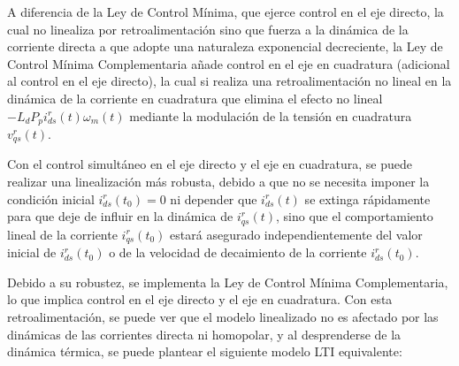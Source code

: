 \documentclass[blue,fullpaper]{ludusofficial}  %
\begin{document}
\begin{enumerate}
    A diferencia de la Ley de Control Mínima, que ejerce control en el eje directo, la cual no linealiza por retroalimentación sino que fuerza a la dinámica de la corriente directa a que adopte una naturaleza exponencial decreciente, la Ley de Control Mínima Complementaria añade control en el eje en cuadratura (adicional al control en el eje directo), la cual si realiza una retroalimentación no lineal en la dinámica de la corriente en cuadratura que elimina el efecto no lineal $-L_{d} P_{p} i_{ds}^{r}(t) \omega_{m}(t) $ mediante la modulación de la tensión en cuadratura $ v_{qs}^{r}(t)$.

    Con el control simultáneo en el eje directo y el eje en cuadratura, se puede realizar una linealización más robusta, debido a que no se necesita imponer la condición inicial $i_{ds}^{r}(t_0) = 0$ ni depender que $i_{ds}^{r}(t)$ se extinga rápidamente para que deje de influir en la dinámica de $i_{qs}^{r}(t)$, sino que el comportamiento lineal de la corriente $i_{qs}^{r}(t_0)$ estará asegurado independientemente del valor inicial de $i_{ds}^{r}(t_0)$ o de la velocidad de decaimiento de la corriente $i_{ds}^{r}(t_0)$.
\end{enumerate}

Debido a su robustez, se implementa la Ley de Control Mínima Complementaria, lo que implica control en el eje directo y el eje en cuadratura. Con esta retroalimentación, se puede ver que el modelo linealizado no es afectado por las dinámicas de las corrientes directa ni homopolar, y al desprenderse de la dinámica térmica, se puede plantear el siguiente modelo LTI equivalente:
\end{document}
